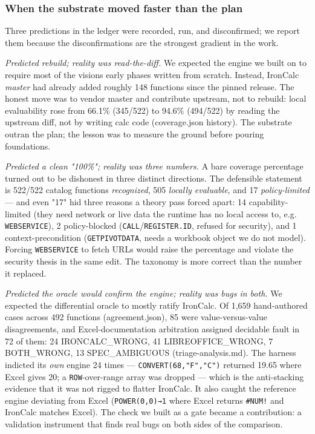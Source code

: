 \documentclass[
]{article}
\begin{document}
\subsubsection{When the substrate moved faster than the
plan}\label{when-the-substrate-moved-faster-than-the-plan}

Three predictions in the ledger were recorded, run, and disconfirmed; we
report them because the disconfirmations are the strongest gradient in
the work.

\emph{Predicted rebuild; reality was read-the-diff.} We expected the
engine we built on to require most of the vision\textquotesingle s early
phases written from scratch. Instead, IronCalc \emph{master} had already
added roughly 148 functions since the pinned release. The honest move
was to vendor master and contribute upstream, not to rebuild: local
evaluability rose from 66.1\% (345/522) to 94.6\% (494/522) by reading
the upstream diff, not by writing calc code (coverage.json history). The
substrate outran the plan; the lesson was to measure the ground before
pouring foundations.

\emph{Predicted a clean "100\%"; reality was three numbers.} A bare
coverage percentage turned out to be dishonest in three distinct
directions. The defensible statement is 522/522 catalog functions
\emph{recognized}, 505 \emph{locally evaluable}, and 17
\emph{policy-limited} --- and even "17" hid three reasons a theory pass
forced apart: 14 capability-limited (they need network or live data the
runtime has no local access to, e.g. \texttt{WEBSERVICE}), 2
policy-blocked (\texttt{CALL}/\texttt{REGISTER.ID}, refused for
security), and 1 context-precondition (\texttt{GETPIVOTDATA}, needs a
workbook object we do not model). Forcing \texttt{WEBSERVICE} to fetch
URLs would raise the percentage and violate the security thesis in the
same edit. The taxonomy is more correct than the number it replaced.

\emph{Predicted the oracle would confirm the engine; reality was bugs in
both.} We expected the differential oracle to mostly ratify IronCalc. Of
1,659 hand-authored cases across 492 functions (agreement.json), 85 were
value-versus-value disagreements, and Excel-documentation arbitration
assigned decidable fault in 72 of them: 24 IRONCALC\_WRONG, 41
LIBREOFFICE\_WRONG, 7 BOTH\_WRONG, 13 SPEC\_AMBIGUOUS
(triage-analysis.md). The harness indicted its \emph{own} engine 24
times --- \texttt{CONVERT(68,"F","C")} returned 19.65 where Excel gives
20; a \texttt{ROW}-over-range array was dropped --- which is the
anti-stacking evidence that it was not rigged to flatter IronCalc. It
also caught the reference engine deviating from Excel
(\texttt{POWER(0,0)→1} where Excel returns \texttt{\#NUM!} and IronCalc
matches Excel). The check we built as a gate became a contribution: a
validation instrument that finds real bugs on both sides of the
comparison.
\end{document}
